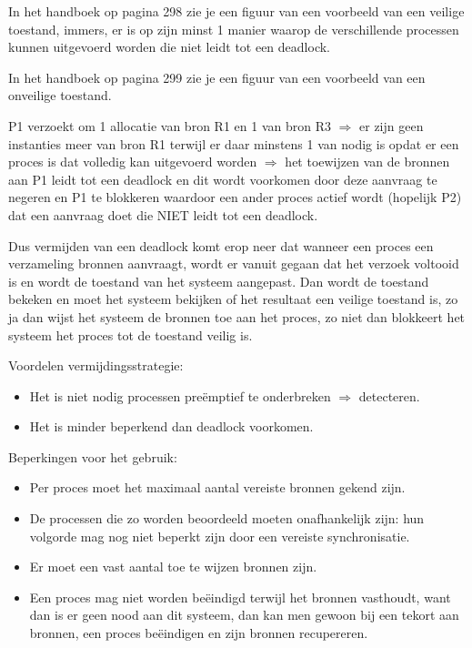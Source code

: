 In het handboek op pagina 298 zie je een figuur van een voorbeeld van een veilige toestand, immers, er is op zijn minst 1 manier waarop de verschillende processen kunnen uitgevoerd worden die niet leidt tot een deadlock.

In het handboek op pagina 299 zie je een figuur van een voorbeeld van een onveilige toestand.

P1 verzoekt om 1 allocatie van bron R1 en 1 van bron R3 $\Rightarrow$ er zijn geen instanties meer van bron R1 terwijl er daar minstens 1 van nodig is opdat er een proces is dat volledig kan uitgevoerd worden $\Rightarrow$ het toewijzen van de bronnen aan P1 leidt tot een deadlock en dit wordt voorkomen door deze aanvraag te negeren en P1 te blokkeren waardoor een ander proces actief wordt (hopelijk P2) dat een aanvraag doet die NIET leidt tot een deadlock.

Dus vermijden van een deadlock komt erop neer dat wanneer een proces een verzameling bronnen aanvraagt, wordt er vanuit gegaan dat het verzoek voltooid is en wordt de toestand van het systeem aangepast. Dan wordt de toestand bekeken en moet het systeem bekijken of het resultaat een veilige toestand is, zo ja dan wijst het systeem de bronnen toe aan het proces, zo niet dan blokkeert het systeem het proces tot de toestand veilig is.

Voordelen vermijdingsstrategie:

\begin{itemize}
\item Het is niet nodig processen preëmptief te onderbreken $\Rightarrow$ detecteren.
\item Het is minder beperkend dan deadlock voorkomen.
\end{itemize}

Beperkingen voor het gebruik:

\begin{itemize}
\item Per proces moet het maximaal aantal vereiste bronnen gekend zijn.
\item De processen die zo worden beoordeeld moeten onafhankelijk zijn: hun volgorde mag nog niet beperkt zijn door een vereiste synchronisatie.
\item Er moet een vast aantal toe te wijzen bronnen zijn.
\item Een proces mag niet worden beëindigd terwijl het bronnen vasthoudt, want dan is er geen nood aan dit systeem, dan kan men gewoon bij een tekort aan bronnen, een proces beëindigen en zijn bronnen recupereren.
\end{itemize}